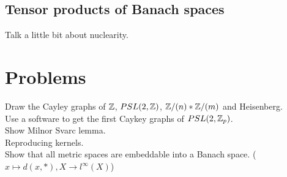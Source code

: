 \subsection{Tensor products of Banach spaces}

Talk a little bit about nuclearity.

\section{Problems}

Draw the Cayley graphs of $\mathbb Z$, $PSL(2,\mathbb Z)$, $\mathbb Z / (n) \ast \mathbb Z / (m)$ and Heisenberg.\\

Use a software to get the first Caykey graphs of $PSL(2,\mathbb Z_p)$.\\

Show Milnor Svarc lemma.\\

Reproducing kernels.\\

Show that all metric spaces are embeddable into a Banach space. ($x\mapsto d(x, *), X\rightarrow l^\infty (X)$)
